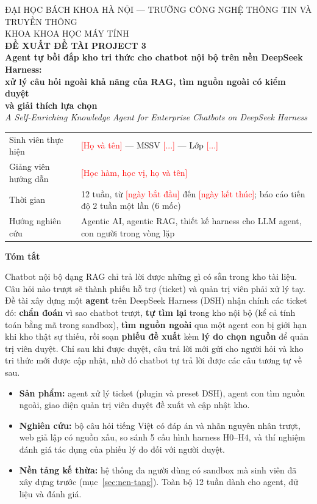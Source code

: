\documentclass[11pt,a4paper]{article}
\newcommand{\dien}[1]{\textcolor{red}{[#1]}}
\newcommand{\keybox}[2]{%
  \par\noindent\colorbox{boxbg}{\parbox{\dimexpr\linewidth-2\fboxsep}{\vspace{3pt}\textbf{#1}\par\vspace{2pt}#2\vspace{3pt}}}\par}
\begin{document}
\begin{center}
  {\small\color{muted} ĐẠI HỌC BÁCH KHOA HÀ NỘI --- TRƯỜNG CÔNG NGHỆ THÔNG TIN VÀ TRUYỀN THÔNG}\\[2pt]
  {\small\color{muted} KHOA KHOA HỌC MÁY TÍNH}\\[10pt]
  {\Large\bfseries\color{ink} ĐỀ XUẤT ĐỀ TÀI PROJECT 3}\\[8pt]
  {\large\bfseries Agent tự bồi đắp kho tri thức cho chatbot nội bộ trên nền DeepSeek Harness:\\
  xử lý câu hỏi ngoài khả năng của RAG, tìm nguồn ngoài có kiểm duyệt\\ và giải thích lựa chọn}\\[4pt]
  {\normalsize\itshape A Self-Enriching Knowledge Agent for Enterprise Chatbots on DeepSeek Harness}
\end{center}
\vspace{6pt}

\begin{tabularx}{\linewidth}{@{}lY@{}}
  \toprule
  Sinh viên thực hiện & \dien{Họ và tên} --- MSSV \dien{...} --- Lớp \dien{...} \\
  Giảng viên hướng dẫn & \dien{Học hàm, học vị, họ và tên} \\
  Thời gian & 12 tuần, từ \dien{ngày bắt đầu} đến \dien{ngày kết thúc}; báo cáo tiến độ 2 tuần một lần (6 mốc) \\
  Hướng nghiên cứu & Agentic AI, agentic RAG, thiết kế harness cho LLM agent, con người trong vòng lặp \\
  \bottomrule
\end{tabularx}

\vspace{6pt}
\keybox{Tóm tắt}{%
Chatbot nội bộ dạng RAG chỉ trả lời được những gì có sẵn trong kho tài liệu. Câu hỏi nào trượt sẽ thành
phiếu hỗ trợ (ticket) và quản trị viên phải xử lý tay. Đề tài xây dựng một \textbf{agent} trên DeepSeek
Harness (DSH) nhận chính các ticket đó: \textbf{chẩn đoán} vì sao chatbot trượt, \textbf{tự tìm lại} trong
kho nội bộ (kể cả tính toán bằng mã trong sandbox), \textbf{tìm nguồn ngoài} qua một agent con bị giới hạn
khi kho thật sự thiếu, rồi soạn \textbf{phiếu đề xuất} kèm \textbf{lý do chọn nguồn} để quản trị viên duyệt.
Chỉ sau khi được duyệt, câu trả lời mới gửi cho người hỏi và kho tri thức mới được cập nhật, nhờ đó
chatbot tự trả lời được các câu tương tự về sau.
\begin{itemize}[leftmargin=14pt]
  \item \textbf{Sản phẩm:} agent xử lý ticket (plugin và preset DSH), agent con tìm nguồn ngoài, giao diện
        quản trị viên duyệt đề xuất và cập nhật kho.
  \item \textbf{Nghiên cứu:} bộ câu hỏi tiếng Việt có đáp án và nhãn nguyên nhân trượt, web giả lập có nguồn
        xấu, so sánh 5 cấu hình harness H0--H4, và thí nghiệm đánh giá tác dụng của phiếu lý do đối với
        người duyệt.
  \item \textbf{Nền tảng kế thừa:} hệ thống đa người dùng có sandbox mà sinh viên đã xây dựng trước
        (mục~\ref{sec:nen-tang}). Toàn bộ 12 tuần dành cho agent, dữ liệu và đánh giá.
\end{itemize}}
\end{document}
